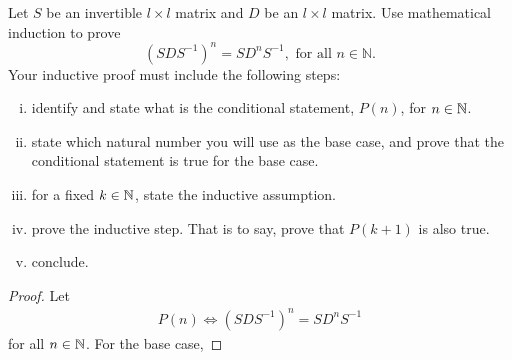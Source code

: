 \begin{question}
\normalfont
Let $S$ be an invertible $l \times l$ matrix and $D$ be an $l \times l$ matrix. Use mathematical induction to prove 
$$
\left(S D S^{-1} \right)^n = S D^n S^{-1}, \text{ for all } n \in \mathbb{N}.
$$ 
Your inductive proof must include the following steps:
	\begin{enumerate}[(i)]
		\item identify and state what is the conditional statement, $P(n)$, for $n\in \mathbb{N}$.
		\item state which natural number you will use as the base case, and prove that the conditional statement is true for the base case.
		\item for a fixed $k\in\mathbb{N}$, state the inductive assumption.
		\item prove the inductive step.  That is to say, prove that $P(k+1)$ is also true.
		\item conclude.
	\end{enumerate}
\end{question}

\begin{proof}
    \renewcommand{\qedsymbol}{$\blacksquare$}
    Let 
    \[
        \begin{aligned}
            P(n)\iff(SDS^{-1})^n=SD^nS^{-1}
        \end{aligned}
    \] for all $n\in\mathbb N$. For the base case, 
    
    \renewcommand{\qedsymbol}{}
\end{proof}